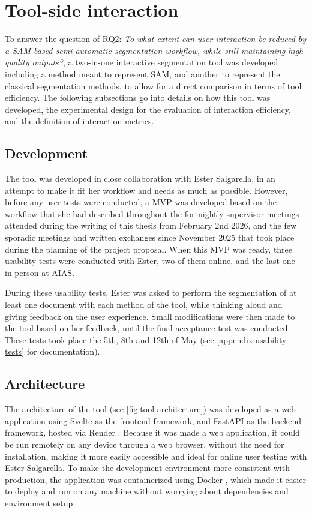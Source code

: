 \section{Tool-side interaction} \label{Interaction efficiency}
To answer the question of \hyperref[rq2]{\acs{RQ}2}: \textit{To what extent can user interaction be reduced by a \acs{SAM}-based semi-automatic segmentation workflow, while still maintaining high-quality outputs?}, a two-in-one interactive segmentation tool was developed including a method meant to represent \acs{SAM}, and another to represent the classical segmentation methods, to allow for a direct comparison in terms of tool efficiency.
The following subsections go into details on how this tool was developed, the experimental design for the evaluation of interaction efficiency, and the definition of interaction metrics.
\subsection{Development}
The tool was developed in close collaboration with Ester Salgarella, in an attempt to make it fit her workflow and needs as much as possible.
However, before any user tests were conducted, a \acf{MVP} was developed based on the workflow that she had described throughout the fortnightly supervisor meetings attended during the writing of this thesis from February 2nd 2026, and the few sporadic meetings and written exchanges since November 2025 that took place during the planning of the project proposal.
When this \acs{MVP} was ready, three usability tests were conducted with Ester, two of them online, and the last one in-person at \acf{AIAS}.

During these usability tests, Ester was asked to perform the segmentation of at least one document with each method of the tool, while thinking aloud and giving feedback on the user experience.
Small modifications were then made to the tool based on her feedback, until the final acceptance test was conducted.
These tests took place the 5th, 8th and 12th of May (see \cref{appendix:usability-tests} for documentation).



\subsection{Architecture}
The architecture of the tool (see \cref{fig:tool-architecture}) was developed as a web-application using Svelte as the frontend framework, and FastAPI as the backend framework, hosted via Render \parencite{Render}.
Because it was made a web application, it could be run remotely on any device through a web browser, without the need for installation, making it more easily accessible and ideal for online user testing with Ester Salgarella.
To make the development environment more consistent with production, the application was containerized using Docker \parencite{DockerDocs}, which made it easier to deploy and run on any machine without worrying about dependencies and environment setup.

